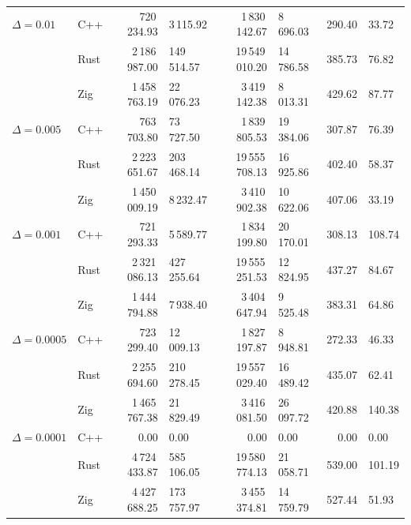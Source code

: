 \begin{table}[htbp]
{\begin{tabular}{l l r@{\,$\pm$\,}l r@{\,$\pm$\,}l r@{\,$\pm$\,}l}
\midrule
$\Delta = 0.01$ & C++ & 720\,234.93 & 3\,115.92 & 1\,830\,142.67 & 8\,696.03 & 290.40 & 33.72 \\
 & Rust & 2\,186\,987.00 & 149\,514.57 & 19\,549\,010.20 & 14\,786.58 & 385.73 & 76.82 \\
 & Zig & 1\,458\,763.19 & 22\,076.23 & 3\,419\,142.38 & 8\,013.31 & 429.62 & 87.77 \\
\midrule
$\Delta = 0.005$ & C++ & 763\,703.80 & 73\,727.50 & 1\,839\,805.53 & 19\,384.06 & 307.87 & 76.39 \\
 & Rust & 2\,223\,651.67 & 203\,468.14 & 19\,555\,708.13 & 16\,925.86 & 402.40 & 58.37 \\
 & Zig & 1\,450\,009.19 & 8\,232.47 & 3\,410\,902.38 & 10\,622.06 & 407.06 & 33.19 \\
\midrule
$\Delta = 0.001$ & C++ & 721\,293.33 & 5\,589.77 & 1\,834\,199.80 & 20\,170.01 & 308.13 & 108.74 \\
 & Rust & 2\,321\,086.13 & 427\,255.64 & 19\,555\,251.53 & 12\,824.95 & 437.27 & 84.67 \\
 & Zig & 1\,444\,794.88 & 7\,938.40 & 3\,404\,647.94 & 9\,525.48 & 383.31 & 64.86 \\
\midrule
$\Delta = 0.0005$ & C++ & 723\,299.40 & 12\,009.13 & 1\,827\,197.87 & 8\,948.81 & 272.33 & 46.33 \\
 & Rust & 2\,255\,694.60 & 210\,278.45 & 19\,557\,029.40 & 16\,489.42 & 435.07 & 62.41 \\
 & Zig & 1\,465\,767.38 & 21\,829.49 & 3\,416\,081.50 & 26\,097.72 & 420.88 & 140.38 \\
\midrule
$\Delta = 0.0001$ & C++ & 0.00 & 0.00 & 0.00 & 0.00 & 0.00 & 0.00 \\
 & Rust & 4\,724\,433.87 & 585\,106.05 & 19\,580\,774.13 & 21\,058.71 & 539.00 & 101.19 \\
 & Zig & 4\,427\,688.25 & 173\,757.97 & 3\,455\,374.81 & 14\,759.79 & 527.44 & 51.93 \\
\bottomrule
\end{tabular}%
}
\end{table}

